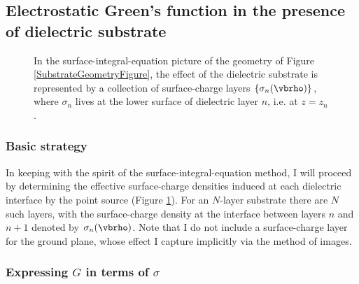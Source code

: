 \documentclass[letterpaper]{article}
\begin{document}
\subsection{Electrostatic Green's function in the presence of
            dielectric substrate}
\begin{figure}
\begin{center}
\caption{In the surface-integral-equation picture of the geometry of Figure
         \ref{SubstrateGeometryFigure}, the effect of the dielectric substrate
         is represented by a collection of surface-charge layers
         $\{\sigma_{n}(\vbrho)\}$, where $\sigma_n$ lives at the 
         lower surface of dielectric layer $n$, i.e. at $z=z_n$.}
\label{SigmaLayersFigure}
\end{center}
\end{figure}

\subsubsection{Basic strategy}

In keeping with the spirit of the surface-integral-equation method, I
will
proceed by determining the effective surface-charge densities
induced at each dielectric interface by the point source
(Figure \ref{SigmaLayersFigure}). For an $N$-layer substrate
there are $N$ such layers, with the surface-charge density at
the interface between layers $n$ and $n+1$ denoted by $\sigma_n(\vbrho)$.
Note that I do not include a
surface-charge layer for the ground plane, whose effect I capture
implicitly via the method of images. 

\subsubsection{Expressing $G$ in terms of $\sigma$}
\end{document}
